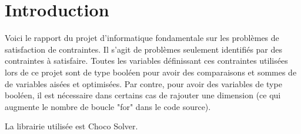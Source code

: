\section{Introduction}
Voici le rapport du projet d'informatique fondamentale sur les problèmes de satisfaction de contraintes. Il s'agit de problèmes seulement identifiés par des contraintes à satisfaire. Toutes les variables définissant ces contraintes utilisées lors de ce projet sont de type booléen pour avoir des comparaisons et sommes de de variables aisées et optimisées. Par contre, pour avoir des variables de type booléen, il est nécessaire dans certains cas de rajouter une dimension (ce qui augmente le nombre de boucle "for" dans le code source).\par 
La librairie utilisée est Choco Solver.
